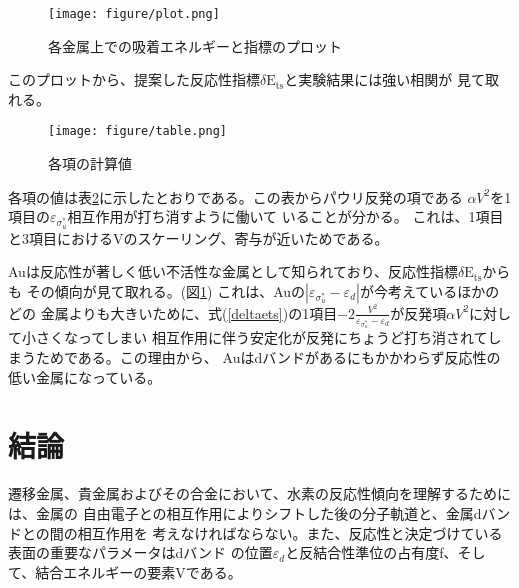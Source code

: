 \documentclass[12pt]{ltjsarticle}
\begin{document}
\begin{figure}[hbtp]
    \begin{center}
     \texttt{[image: figure/plot.png]}
    \end{center}
    \caption{各金属上での吸着エネルギーと指標のプロット}
    \label{fig:plot}
\end{figure}

このプロットから、提案した反応性指標$\delta \text{E}_\text{ts}$と実験結果には強い相関が
見て取れる。

\begin{figure}[hbtp]
    \begin{center}
     \texttt{[image: figure/table.png]}
    \end{center}
    \caption{各項の計算値}
    \label{fig:table}
\end{figure}

各項の値は表\ref{fig:table}に示したとおりである。この表からパウリ反発の項である
$\alpha V^2$を1項目の$\varepsilon _{\sigma_u^*}$相互作用が打ち消すように働いて
いることが分かる。
これは、1項目と3項目におけるVのスケーリング、寄与が近いためである。

Auは反応性が著しく低い不活性な金属として知られており、反応性指標$\delta \text{E}_\text{ts}$からも
その傾向が見て取れる。(図\ref{fig:plot})
これは、Auの$| \varepsilon _{\sigma_u^*} - \varepsilon _d|$が今考えているほかのどの
金属よりも大きいために、式(\ref{deltaets})の1項目$-2 \frac{ V^2 }{\varepsilon _
{\sigma_u^*} - \varepsilon _d}$が反発項$\alpha V^2$に対して小さくなってしまい
相互作用に伴う安定化が反発にちょうど打ち消されてしまうためである。この理由から、
Auはdバンドがあるにもかかわらず反応性の低い金属になっている。

\section{結論}
遷移金属、貴金属およびその合金において、水素の反応性傾向を理解するためには、金属の
自由電子との相互作用によりシフトした後の分子軌道と、金属dバンドとの間の相互作用を
考えなければならない。また、反応性と決定づけている表面の重要なパラメータはdバンド
の位置$\varepsilon_d$と反結合性準位の占有度f、そして、結合エネルギーの要素Vである。



\end{document}
